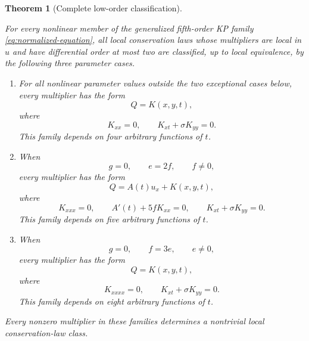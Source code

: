 \documentclass[11pt]{article}
\numberwithin{equation}{section}
\newtheorem{theorem}{Theorem}[section]
\theoremstyle{definition}
\theoremstyle{remark}
\begin{document}
\begin{theorem}[Complete low-order classification]
\label{thm:complete-classification}

For every nonlinear member of the generalized fifth-order KP family
\eqref{eq:normalized-equation}, all local conservation laws whose
multipliers are local in $u$ and have differential order at most two
are classified, up to local equivalence, by the following three
parameter cases.

\begin{enumerate}[label=\textnormal{(\roman*)}]

\item For all nonlinear parameter values outside the two exceptional
cases below, every multiplier has the form
\begin{equation*}
Q=K(x,y,t),
\end{equation*}
where
\begin{equation*}
K_{xx}=0,
\qquad
K_{xt}+\sigma K_{yy}=0.
\end{equation*}
This family depends on four arbitrary functions of $t$.

\item When
\begin{equation*}
g=0,
\qquad
e=2f,
\qquad
f\neq0,
\end{equation*}
every multiplier has the form
\begin{equation*}
Q=A(t)u_x+K(x,y,t),
\end{equation*}
where
\begin{equation*}
K_{xxx}=0,
\qquad
A'(t)+5fK_{xx}=0,
\qquad
K_{xt}+\sigma K_{yy}=0.
\end{equation*}
This family depends on five arbitrary functions of $t$.

\item When
\begin{equation*}
g=0,
\qquad
f=3e,
\qquad
e\neq0,
\end{equation*}
every multiplier has the form
\begin{equation*}
Q=K(x,y,t),
\end{equation*}
where
\begin{equation*}
K_{xxxx}=0,
\qquad
K_{xt}+\sigma K_{yy}=0.
\end{equation*}
This family depends on eight arbitrary functions of $t$.

\end{enumerate}

Every nonzero multiplier in these families determines a nontrivial
local conservation-law class.

\end{theorem}
\end{document}

